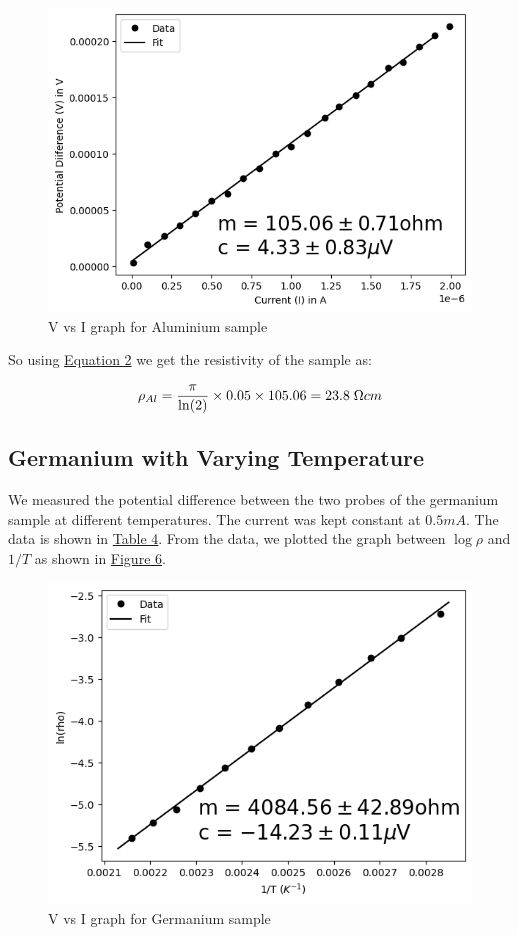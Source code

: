 		\begin{figure}[h]
			\centering
			\includegraphics[width=0.8\columnwidth]{images/g3.png}
			\caption{V vs I graph for Aluminium sample}
			\label{graph:3}
		\end{figure}

		So using \hyperref[eq:2]{Equation 2} we get the resistivity of the sample as:

		$$\rho_{Al} = \frac{\pi}{\ln(2)}\times0.05\times105.06 = 23.8\;\ohm cm$$

	\subsection{Germanium with Varying Temperature}

		We measured the potential difference between the two probes of the germanium sample at different temperatures. The current was kept constant at $0.5mA$. The data is shown in \hyperref[tab:4]{Table 4}. From the data, we plotted the graph between $\log\rho$ and $1/T$ as shown in \hyperref[graph:4]{Figure 6}.

		
		
		\begin{figure}[h]
			\centering
			\includegraphics[width=0.8\columnwidth]{images/g4.png}
			\caption{V vs I graph for Germanium sample}
			\label{graph:4}
		\end{figure}


